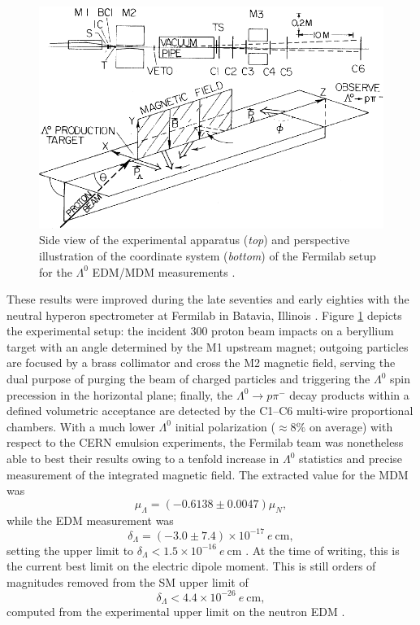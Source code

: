 \begin{figure}[t]
	\centering
	\includegraphics[width=.7\textwidth]{graphics/01-standard_model/fermilab_edm_setup.png}
	\caption[Side view of the experimental apparatus and perspective illustration of the coordinate system of the Fermilab setup for the $\Lambda^0$ EDM/MDM measurements.]{Side view of the experimental apparatus (\textit{top}) and perspective illustration of the coordinate system (\textit{bottom}) of the Fermilab setup for the $\Lambda^0$ EDM/MDM measurements \cite{PhysRevLett.41.1348}.}
	\label{fig:1:fermilab_edm_setup}
\end{figure}

These results were improved during the late seventies and early eighties with the neutral hyperon spectrometer at Fermilab in Batavia, Illinois \cite{PhysRevLett.41.1348} \cite{PhysRevD.23.814}.
Figure \ref{fig:1:fermilab_edm_setup} depicts the experimental setup: the incident \SI{300}{\gev} proton beam impacts on a beryllium target with an angle determined by the M1 upstream magnet;
outgoing particles are focused by a brass collimator and cross the M2 magnetic field, serving the dual purpose of purging the beam of charged particles and triggering the $\Lambda^0$ spin precession in the horizontal plane;
finally, the $\Lambda^0 \rightarrow p\pi^-$ decay products within a defined volumetric acceptance are detected by the C1--C6 multi-wire proportional chambers.
With a much lower $\Lambda^0$ initial polarization ($\approx 8\%$ on average) with respect to the CERN emulsion experiments, the Fermilab team was nonetheless able to best their results owing to a tenfold increase in $\Lambda^0$ statistics and precise measurement of the integrated magnetic field. The extracted value for the MDM \cite{PhysRevLett.41.1348} was
\begin{equation}
\mu_\Lambda = \left( -0.6138 \pm 0.0047 \right) \mu_N,
\end{equation}
while the EDM measurement \cite{PhysRevD.23.814} was
\begin{equation}
\delta_\Lambda = \left( -3.0 \pm 7.4 \right)\times {10}^{-17}~e~\si{\centi\meter},
\end{equation}
setting the upper limit to $\delta_\Lambda < 1.5\times{10}^{-16}~e~\si{\centi\meter}$ \cite{PDG}.
At the time of writing, this is the current best limit on the \lz electric dipole moment.
This is still orders of magnitudes removed from the SM upper limit of
\begin{equation}
\delta_\Lambda < 4.4\times{10}^{-26}~e~\si{\centi\meter},
\end{equation}
computed from the experimental upper limit on the neutron EDM \cite{PhysRevD.61.114017}.

